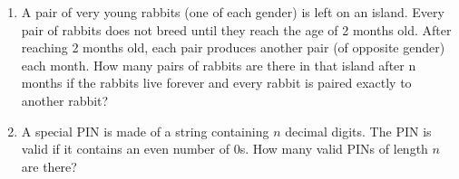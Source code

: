 \documentclass[12pt]{scrartcl}
\begin{document}
\begin{enumerate}
    \item A pair of very young rabbits (one of each gender) is left on an island. Every pair of rabbits does not breed until they reach the age of 2 months old. After reaching 2 months old, each pair produces another pair (of opposite gender) each month. How many pairs of rabbits are there in that island after n months if the rabbits live forever and every rabbit is paired exactly to another rabbit?

    \item A special PIN is made of a string containing $n$ decimal digits. The PIN is valid if it contains an even number of 0s. How many valid PINs of length $n$ are there?
\end{enumerate}
\end{document}
